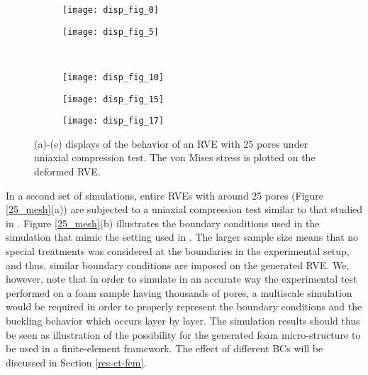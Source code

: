 \begin{figure}
	\centering
	\begin{subfigure}[b]{0.32\textwidth}
		\texttt{[image: disp\_fig\_0]}
		\caption{}
	\end{subfigure}
	\begin{subfigure}[b]{0.3\textwidth}
		\texttt{[image: disp\_fig\_5]}
		\caption{}
	\end{subfigure}\\
	\begin{subfigure}[b]{0.3\textwidth}
		\texttt{[image: disp\_fig\_10]}
		\caption{}
	\end{subfigure}
	\begin{subfigure}[b]{0.3\textwidth}
		\texttt{[image: disp\_fig\_15]}
		\caption{}
	\end{subfigure}
	\begin{subfigure}[b]{0.35\textwidth}
		\texttt{[image: disp\_fig\_17]}
		\caption{}
	\end{subfigure}
	\caption{(a)-(e) displays of the behavior of an RVE with 25 pores under uniaxial compression test. The von Mises stress is plotted on the deformed RVE.}\label{25-stress-strain-2}
\end{figure}
In a second set of simulations, entire RVEs with around 25 pores (Figure \ref{25_mesh}(a)) are subjected to a uniaxial compression test similar to that studied in \cite{jungMicrostructuralCharacterisationExperimental2017}. Figure \ref{25_mesh}(b) illustrates the boundary conditions used in the simulation that mimic the setting used in \cite{jungMicrostructuralCharacterisationExperimental2017}. The larger sample size means that  no special treatments was considered at the boundaries in the experimental setup, and thus, similar boundary conditions are imposed on the generated RVE.
{We, however, note that in order to simulate in an accurate way the experimental test performed on a foam sample having thousands of pores, a multiscale simulation would be required in order to properly represent the boundary conditions and the buckling behavior which occurs layer by layer. The simulation results should thus be seen as illustration of the possibility for the generated foam micro-structure to be used in a finite-element framework.} The effect of different BCs will be discussed in Section \ref{res-ct-fem}.

